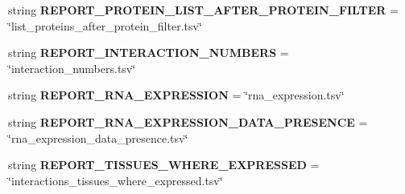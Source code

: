 \begin{DoxyCompactItemize}
\item 
\hypertarget{classsrc_1_1fr_1_1tagc_1_1rainet_1_1core_1_1execution_1_1AnalysisStrategy_1_1AnalysisStrategy_aee7f68ef784ed9d1e4765234d599fe59}{string {\bfseries R\-E\-P\-O\-R\-T\-\_\-\-P\-R\-O\-T\-E\-I\-N\-\_\-\-L\-I\-S\-T\-\_\-\-A\-F\-T\-E\-R\-\_\-\-P\-R\-O\-T\-E\-I\-N\-\_\-\-F\-I\-L\-T\-E\-R} = \char`\"{}list\-\_\-proteins\-\_\-after\-\_\-protein\-\_\-filter.\-tsv\char`\"{}}\label{classsrc_1_1fr_1_1tagc_1_1rainet_1_1core_1_1execution_1_1AnalysisStrategy_1_1AnalysisStrategy_aee7f68ef784ed9d1e4765234d599fe59}

\item 
\hypertarget{classsrc_1_1fr_1_1tagc_1_1rainet_1_1core_1_1execution_1_1AnalysisStrategy_1_1AnalysisStrategy_a8753a6c83671c7edf56b5945529dede4}{string {\bfseries R\-E\-P\-O\-R\-T\-\_\-\-I\-N\-T\-E\-R\-A\-C\-T\-I\-O\-N\-\_\-\-N\-U\-M\-B\-E\-R\-S} = \char`\"{}interaction\-\_\-numbers.\-tsv\char`\"{}}\label{classsrc_1_1fr_1_1tagc_1_1rainet_1_1core_1_1execution_1_1AnalysisStrategy_1_1AnalysisStrategy_a8753a6c83671c7edf56b5945529dede4}

\item 
\hypertarget{classsrc_1_1fr_1_1tagc_1_1rainet_1_1core_1_1execution_1_1AnalysisStrategy_1_1AnalysisStrategy_aa9c97f0191f79331495adbe95b5a3bbf}{string {\bfseries R\-E\-P\-O\-R\-T\-\_\-\-R\-N\-A\-\_\-\-E\-X\-P\-R\-E\-S\-S\-I\-O\-N} = \char`\"{}rna\-\_\-expression.\-tsv\char`\"{}}\label{classsrc_1_1fr_1_1tagc_1_1rainet_1_1core_1_1execution_1_1AnalysisStrategy_1_1AnalysisStrategy_aa9c97f0191f79331495adbe95b5a3bbf}

\item 
\hypertarget{classsrc_1_1fr_1_1tagc_1_1rainet_1_1core_1_1execution_1_1AnalysisStrategy_1_1AnalysisStrategy_ae5e69144a18e711d130e9a985b166eb5}{string {\bfseries R\-E\-P\-O\-R\-T\-\_\-\-R\-N\-A\-\_\-\-E\-X\-P\-R\-E\-S\-S\-I\-O\-N\-\_\-\-D\-A\-T\-A\-\_\-\-P\-R\-E\-S\-E\-N\-C\-E} = \char`\"{}rna\-\_\-expression\-\_\-data\-\_\-presence.\-tsv\char`\"{}}\label{classsrc_1_1fr_1_1tagc_1_1rainet_1_1core_1_1execution_1_1AnalysisStrategy_1_1AnalysisStrategy_ae5e69144a18e711d130e9a985b166eb5}

\item 
\hypertarget{classsrc_1_1fr_1_1tagc_1_1rainet_1_1core_1_1execution_1_1AnalysisStrategy_1_1AnalysisStrategy_af7aefdde072f83459c98f8df759f1d4e}{string {\bfseries R\-E\-P\-O\-R\-T\-\_\-\-T\-I\-S\-S\-U\-E\-S\-\_\-\-W\-H\-E\-R\-E\-\_\-\-E\-X\-P\-R\-E\-S\-S\-E\-D} = \char`\"{}interactions\-\_\-tissues\-\_\-where\-\_\-expressed.\-tsv\char`\"{}}\label{classsrc_1_1fr_1_1tagc_1_1rainet_1_1core_1_1execution_1_1AnalysisStrategy_1_1AnalysisStrategy_af7aefdde072f83459c98f8df759f1d4e}


\end{DoxyCompactItemize}
